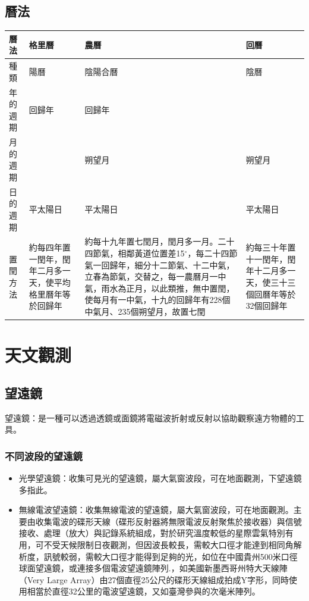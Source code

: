 \documentclass[a4paper,12pt]{report}
\begin{document}
\subsection{曆法}
\bct\bfH\ctr\begin{tabular}{|p{}|p{}|p{}|p{}|}
\hline
曆法 & 格里曆 & 農曆 & 回曆 \\\hline
種類 & 陽曆 & 陰陽合曆 & 陰曆 \\\hline
年的週期 & 回歸年 & 回歸年 & \\\hline
月的週期 & & 朔望月 & 朔望月 \\\hline
日的週期 & 平太陽日 & 平太陽日 & 平太陽日 \\\hline
置閏方法 & 約每四年置一閏年，閏年二月多一天，使平均格里曆年等於回歸年 & 約每十九年置七閏月，閏月多一月。二十四節氣，相鄰黃道位置差15$^\circ$，每二十四節氣一回歸年，細分十二節氣、十二中氣，立春為節氣，交替之，每一農曆月一中氣，雨水為正月，以此類推，無中置閏，使每月有一中氣，十九的回歸年有228個中氣月、235個朔望月，故置七閏 & 約每三十年置十一閏年，閏年十二月多一天，使三十三個回曆年等於32個回歸年 \\\hline
\end{tabular}\ef\FB\ect
\section{天文觀測}
\subsection{望遠鏡}
望遠鏡：是一種可以透過透鏡或面鏡將電磁波折射或反射以協助觀察遠方物體的工具。
\subsubsection{不同波段的望遠鏡}
\begin{itemize}
\item 光學望遠鏡：收集可見光的望遠鏡，屬大氣窗波段，可在地面觀測，下望遠鏡多指此。
\item 無線電波望遠鏡：收集無線電波的望遠鏡，屬大氣窗波段，可在地面觀測。主要由收集電波的碟形天線（碟形反射器將無限電波反射聚焦於接收器）與信號接收、處理（放大）與記錄系統組成，對於研究溫度較低的星際雲氣特別有用，可不受天候限制日夜觀測，但因波長較長，需較大口徑才能達到相同角解析度，訊號較弱，需較大口徑才能得到足夠的光，如位在中國貴州500米口徑球面望遠鏡，或連接多個電波望遠鏡陣列.，如美國新墨西哥州特大天線陣（Very Large Array）由27個直徑25公尺的碟形天線組成拍成Y字形，同時使用相當於直徑32公里的電波望遠鏡，又如臺灣參與的次毫米陣列。
\end{itemize}
\end{document}
